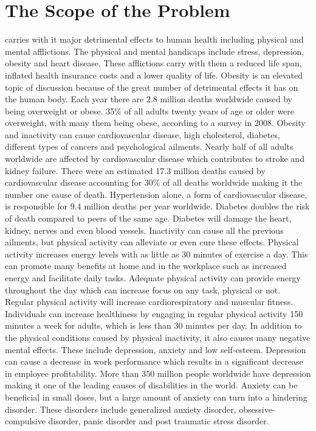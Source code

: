 \documentclass[12pt,article]{IEEEtran}
\begin{document}
	\section{The Scope of the Problem}
		 carries with it major detrimental effects to human health including physical and mental afflictions.  The physical and mental handicaps include stress, depression, obesity and heart disease.  These afflictions carry with them a reduced life span, inflated health insurance costs and a lower quality of life.
		Obesity is an elevated topic of discussion because of the great number of detrimental effects it has on the human body.  Each year there are 2.8 million deaths worldwide caused by being overweight or obese.  35\% of all adults twenty years of age or older were overweight, with many them being obese, according to a survey in 2008. \cite{14}  Obesity and inactivity can cause cardiovascular disease, high cholesterol, diabetes, different types of cancers and psychological ailments.  Nearly half of all adults worldwide are affected by cardiovascular disease which contributes to stroke and kidney failure.  There were an estimated 17.3 million deaths caused by cardiovascular disease accounting for 30\% of all deaths worldwide making it the number one cause of death. \cite{4}  Hypertension alone, a form of cardiovascular disease, is responsible for 9.4 million deaths per year worldwide. \cite{3}  Diabetes doubles the risk of death compared to peers of the same age.  Diabetes will damage the heart, kidney, nerves and even blood vessels. \cite{15}
		Inactivity can cause all the previous ailments, but physical activity can alleviate or even cure these effects. Physical activity increases energy levels with as little as 30 minutes of exercise a day. \cite{16} This can promote many benefits at home and in the workplace such as increased energy and facilitate daily tasks.  Adequate physical activity can provide energy throughout the day which can increase focus on any task, physical or not. \cite{17}  Regular physical activity will increase cardiorespiratory and muscular fitness. \cite{3} Individuals can increase healthiness by engaging in regular physical activity 150 minutes a week for adults, which is less than 30 minutes per day. \cite{18}
		In addition to the physical conditions caused by physical inactivity, it also causes many negative mental effects.  These include depression, anxiety and low self-esteem.  Depression can cause a decrease in work performance which results in a significant decrease in employee profitability. \cite{11}  More than 350 million people worldwide have depression making it one of the leading causes of disabilities in the world.  \cite{12} Anxiety can be beneficial in small doses, but a large amount of anxiety can turn into a hindering disorder. These disorders include generalized anxiety disorder, obsessive-compulsive disorder, panic disorder and post traumatic stress disorder. \cite{13}  
\end{document}
